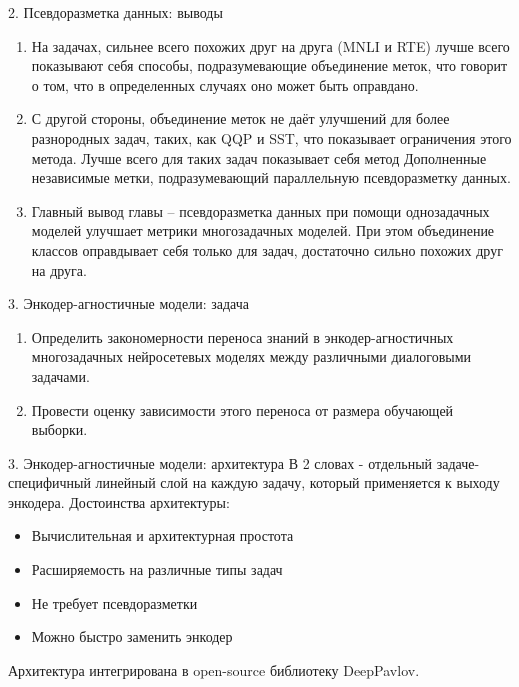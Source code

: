 \begin{frame}{2. Псевдоразметка данных: выводы}
\begin{enumerate}
\item На задачах, сильнее всего похожих друг на друга (MNLI и RTE) лучше всего показывают себя способы, подразумевающие объединение меток, что говорит о том, что в определенных случаях оно может быть оправдано. 

\item С другой стороны, объединение меток не даёт улучшений для более разнородных задач, таких, как QQP и SST, что показывает ограничения этого метода. Лучше всего для таких задач показывает себя метод Дополненные независимые метки, подразумевающий параллельную псевдоразметку данных. 

\item Главный вывод главы -- псевдоразметка данных при помощи однозадачных моделей улучшает метрики многозадачных моделей. При этом объединение классов оправдывает себя только для задач, достаточно сильно похожих друг на друга. 
\end{enumerate}
\end{frame}

\begin{frame}{3. Энкодер-агностичные модели: задача}
\begin{enumerate}
    \item Определить закономерности переноса знаний в энкодер-агностичных многозадачных нейросетевых моделях между различными диалоговыми задачами.
    \item Провести оценку зависимости этого переноса от размера обучающей выборки.
 \end{enumerate}
\end{frame}

\begin{frame}{3. Энкодер-агностичные модели: архитектура}
В 2 словах - отдельный задаче-специфичный линейный слой на каждую задачу, который применяется к выходу энкодера.
Достоинства архитектуры:
\begin{itemize}
  \item Вычислительная и архитектурная простота
  \item Расширяемость на различные типы задач
  \item Не требует псевдоразметки
  \item Можно быстро заменить энкодер
\end{itemize}
Архитектура интегрирована в open-source библиотеку DeepPavlov.
\end{frame}

